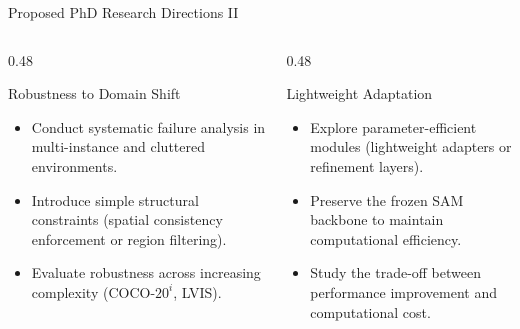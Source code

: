 \documentclass[aspectratio=169, 10pt]{beamer}
\begin{document}
\begin{frame}{Proposed PhD Research Directions II}
    \begin{columns}[T]
        \begin{column}{0.48\textwidth}
            \begin{block}{Robustness to Domain Shift}
                \footnotesize
                \begin{itemize}
                    \item Conduct systematic failure analysis in multi-instance and cluttered environments.
                    \item Introduce simple structural constraints (spatial consistency enforcement or region filtering).
                    \item Evaluate robustness across increasing complexity (COCO-$20^i$, LVIS).
                \end{itemize}
            \end{block}
        \end{column}
        \begin{column}{0.48\textwidth}
            \begin{block}{Lightweight Adaptation}
                \footnotesize
                \begin{itemize}
                    \item Explore parameter-efficient modules (lightweight adapters or refinement layers).
                    \item Preserve the frozen SAM backbone to maintain computational efficiency.
                    \item Study the trade-off between performance improvement and computational cost.
                \end{itemize}
            \end{block}
        \end{column}
    \end{columns}
\end{frame}
\end{document}
